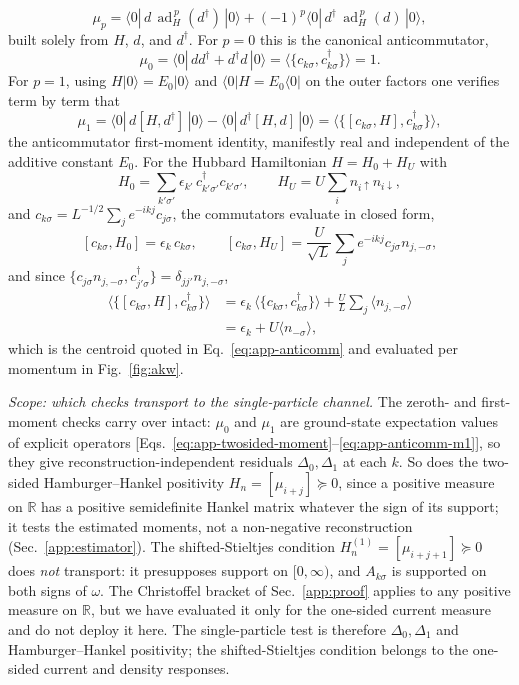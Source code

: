 \documentclass[aps,prb,onecolumn,superscriptaddress,longbibliography,floatfix]{revtex4-2}
\begin{document}
\begin{equation}
\mu_p=\langle 0|\,d\,\operatorname{ad}_H^{\,p}(d^\dagger)\,|0\rangle+(-1)^p\langle 0|\,d^\dagger\,\operatorname{ad}_H^{\,p}(d)\,|0\rangle,
\label{eq:app-twosided-moment}
\end{equation}
built solely from $H$, $d$, and $d^\dagger$. For $p=0$ this is the canonical anticommutator,
\[
\mu_0=\langle 0|\,dd^\dagger+d^\dagger d\,|0\rangle=\langle\{c_{k\sigma},c_{k\sigma}^\dagger\}\rangle=1 .
\]
For $p=1$, using $H|0\rangle=E_0|0\rangle$ and $\langle 0|H=E_0\langle 0|$ on the outer factors one verifies term by term that
\begin{equation}
\mu_1=\langle 0|\,d[H,d^\dagger]\,|0\rangle-\langle 0|\,d^\dagger[H,d]\,|0\rangle=\big\langle\{[c_{k\sigma},H],c_{k\sigma}^\dagger\}\big\rangle,
\label{eq:app-anticomm-m1}
\end{equation}
the anticommutator first-moment identity, manifestly real and independent of the additive constant $E_0$. For the Hubbard Hamiltonian $H=H_0+H_U$ with
\[
H_0=\sum_{k'\sigma'}\epsilon_{k'}\,c^\dagger_{k'\sigma'}c_{k'\sigma'},\qquad H_U=U\sum_i n_{i\uparrow}n_{i\downarrow},
\]
and $c_{k\sigma}=L^{-1/2}\sum_j e^{-ikj}c_{j\sigma}$, the commutators evaluate in closed form,
\[
[c_{k\sigma},H_0]=\epsilon_k\,c_{k\sigma},\qquad [c_{k\sigma},H_U]=\frac{U}{\sqrt L}\sum_j e^{-ikj}c_{j\sigma}n_{j,-\sigma},
\]
and since $\{c_{j\sigma}n_{j,-\sigma},c_{j'\sigma}^\dagger\}=\delta_{jj'}n_{j,-\sigma}$,
\begin{equation}
\begin{split}
\big\langle\{[c_{k\sigma},H],c_{k\sigma}^\dagger\}\big\rangle&=\epsilon_k\,\langle\{c_{k\sigma},c_{k\sigma}^\dagger\}\rangle+\frac{U}{L}\sum_j\langle n_{j,-\sigma}\rangle\\
&=\epsilon_k+U\langle n_{-\sigma}\rangle,
\end{split}
\end{equation}
which is the centroid quoted in Eq.~\eqref{eq:app-anticomm} and evaluated per momentum in Fig.~\ref{fig:akw}.

\emph{Scope: which checks transport to the single-particle channel.} The zeroth- and first-moment checks carry over intact: $\mu_0$ and $\mu_1$ are ground-state expectation values of explicit operators [Eqs.~\eqref{eq:app-twosided-moment}--\eqref{eq:app-anticomm-m1}], so they give reconstruction-independent residuals $\Delta_0,\Delta_1$ at each $k$. So does the two-sided Hamburger--Hankel positivity $H_n=[\mu_{i+j}]\succeq 0$, since a positive measure on $\mathbb{R}$ has a positive semidefinite Hankel matrix whatever the sign of its support; it tests the estimated moments, not a non-negative reconstruction (Sec.~\ref{app:estimator}). The shifted-Stieltjes condition $H_n^{(1)}=[\mu_{i+j+1}]\succeq 0$ does \emph{not} transport: it presupposes support on $[0,\infty)$, and $A_{k\sigma}$ is supported on both signs of $\omega$. The Christoffel bracket of Sec.~\ref{app:proof} applies to any positive measure on $\mathbb{R}$, but we have evaluated it only for the one-sided current measure and do not deploy it here. The single-particle test is therefore $\Delta_0,\Delta_1$ and Hamburger--Hankel positivity; the shifted-Stieltjes condition belongs to the one-sided current and density responses.
\end{document}
